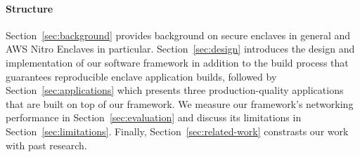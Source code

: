 \paragraph{Structure}

Section~\ref{sec:background} provides background on secure enclaves in general
and AWS Nitro Enclaves in particular.  Section~\ref{sec:design} introduces the
design and implementation of our software framework in addition to the build
process that guarantees reproducible enclave application builds, followed by
Section~\ref{sec:applications} which presents three production-quality
applications that are built on top of our framework.  We measure our framework's
networking performance in Section~\ref{sec:evaluation} and discuss its
limitations in Section~\ref{sec:limitations}.  Finally,
Section~\ref{sec:related-work} constrasts our work with past research.
